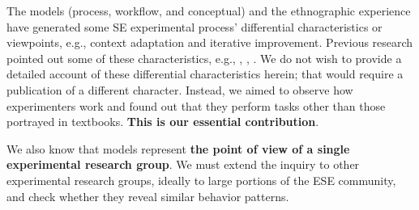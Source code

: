 The models (process, workflow, and conceptual) and the ethnographic experience have generated some SE experimental process' differential characteristics or viewpoints, e.g., context adaptation and iterative improvement. Previous research pointed out some of these characteristics, e.g., \cite{Mohamed-1993-roles-ESE}, \cite{Sjoberg-2005-survey-experiments-SE}, \cite{Shull-2004-Knowledge-sharing-issues-SE}. We do not wish to provide a detailed account of these differential characteristics herein; that would require a publication of a different character. Instead, we aimed to observe how experimenters work and found out that they perform tasks other than those portrayed in textbooks. \textbf{This is our essential contribution}.

We also know that models represent \textbf{the point of view of a single experimental research group}. We must extend the inquiry to other experimental research groups, ideally to large portions of the ESE community, and check whether they reveal similar behavior patterns.